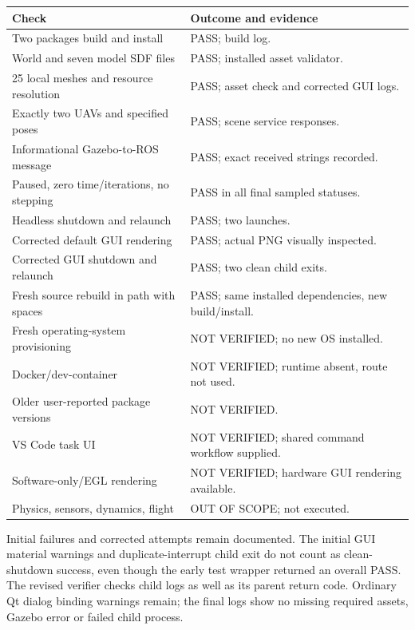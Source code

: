 \begin{center}\begin{longtable}{p{.53\linewidth}p{.35\linewidth}}\toprule
Check & Outcome and evidence\\\midrule\endhead
Two packages build and install & PASS; build log.\\
World and seven model SDF files & PASS; installed asset validator.\\
25 local meshes and resource resolution & PASS; asset check and corrected GUI logs.\\
Exactly two UAVs and specified poses & PASS; scene service responses.\\
Informational Gazebo-to-ROS message & PASS; exact received strings recorded.\\
Paused, zero time/iterations, no stepping & PASS in all final sampled statuses.\\
Headless shutdown and relaunch & PASS; two launches.\\
Corrected default GUI rendering & PASS; actual PNG visually inspected.\\
Corrected GUI shutdown and relaunch & PASS; two clean child exits.\\
Fresh source rebuild in path with spaces & PASS; same installed dependencies, new build/install.\\
Fresh operating-system provisioning & NOT VERIFIED; no new OS installed.\\
Docker/dev-container & NOT VERIFIED; runtime absent, route not used.\\
Older user-reported package versions & NOT VERIFIED.\\
VS Code task UI & NOT VERIFIED; shared command workflow supplied.\\
Software-only/EGL rendering & NOT VERIFIED; hardware GUI rendering available.\\
Physics, sensors, dynamics, flight & OUT OF SCOPE; not executed.\\\bottomrule
\end{longtable}\end{center}

Initial failures and corrected attempts remain documented. The initial GUI material warnings and duplicate-interrupt child exit do not count as clean-shutdown success, even though the early test wrapper returned an overall PASS. The revised verifier checks child logs as well as its parent return code. Ordinary Qt dialog binding warnings remain; the final logs show no missing required assets, Gazebo error or failed child process.

